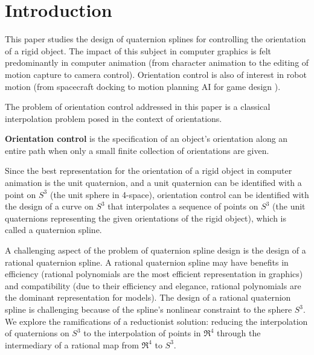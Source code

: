 \documentclass[12pt]{article}
\begin{document}
\begin{abstract}
First paper should be simply about the mapping choices and a comparison with
other techniques.
The second paper should be about refinements including partitioning for pole avoidance,
optimal pole avoidance strategies for a subset, normalization, and rotation methods away
from the pole. Otherwise the issues get confused and the paper gets too long.

Capturing orientations with keylocal: GUI is fine for now.
As you capture a keyframe, encode it as a quaternion.
Allow cycling through keyframes, forwards and backwards.

Eventual goal: orientation obstacles.
But first we need to clarify quaternion spline theory, which define the
orientation obstacles.
\end{abstract}

\section{Introduction}

This paper studies the design of quaternion splines for controlling the orientation
of a rigid object.
The impact of this subject in computer graphics is felt predominantly 
in computer animation (from character animation \cite{catmull, elaborations on sig78}
to the editing of motion capture \cite{gleicher} to camera control).
Orientation control is also of interest in robot motion (from spacecraft docking 
\cite{junkins?} to motion planning AI for game design \cite{game design book}).

The problem of orientation control addressed in this paper is a classical
interpolation problem posed in the context of orientations.
%
\begin{defn2}
{\bf Orientation control} is the specification of an object's orientation along
an entire path when only a small finite collection of orientations are given.
\end{defn2}
%
Since the best representation for the orientation of a rigid object in computer animation
is the unit quaternion,
and a unit quaternion can be identified with a point on $S^3$ (the unit sphere 
in 4-space), orientation control can be identified with the design of a curve on $S^3$
that interpolates a sequence of points on $S^3$ (the unit quaternions representing
the given orientations of the rigid object), which is called a quaternion spline.

A challenging aspect of the problem of quaternion spline design is
the design of a rational quaternion spline.
A rational quaternion spline may have benefits in efficiency
(rational polynomials are the most efficient representation in graphics)
and compatibility (due to their efficiency and elegance, rational polynomials are
the dominant representation for models).
The design of a rational quaternion spline is challenging because 
of the spline's nonlinear constraint to the sphere $S^3$.
We explore the ramifications of a reductionist solution:
reducing the interpolation of quaternions on $S^3$ to the interpolation of
points in $\Re^4$ through the intermediary of a rational map from $\Re^4$ to $S^3$.
\end{document}
